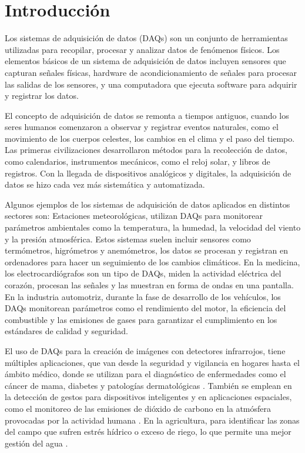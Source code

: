 \chapter{Introducción}

Los sistemas de adquisición de datos (DAQs) son un conjunto de herramientas utilizadas para recopilar, procesar y analizar datos de fenómenos físicos. Los elementos básicos de un sistema de adquisición de datos incluyen sensores que capturan señales físicas, hardware de acondicionamiento de señales para procesar las salidas de los sensores, y una computadora que ejecuta software para adquirir y registrar los datos. 


El concepto de adquisición de datos se remonta a tiempos antiguos, cuando los seres humanos comenzaron a observar y registrar eventos naturales, como el movimiento de los cuerpos celestes, los cambios en el clima y el paso del tiempo. Las primeras civilizaciones desarrollaron métodos para la recolección de datos, como calendarios, instrumentos mecánicos, como el reloj solar, y libros de registros. Con la llegada de dispositivos analógicos y digitales, la adquisición de datos se hizo cada vez más sistemática y automatizada.


Algunos ejemplos de los sistemas de adquisición de datos aplicados en distintos sectores son: Estaciones meteorológicas, utilizan DAQs para monitorear parámetros ambientales como la temperatura, la humedad, la velocidad del viento y la presión atmosférica. Estos sistemas suelen incluir sensores como termómetros, higrómetros y anemómetros, los datos se procesan y registran en ordenadores para hacer un seguimiento de los cambios climáticos. En la medicina, los electrocardiógrafos son un tipo de DAQs, miden la actividad eléctrica del corazón, procesan las señales y las muestran en forma de ondas en una pantalla. En la industria automotriz, durante la fase de desarrollo de los vehículos, los DAQs monitorean parámetros como el rendimiento del motor, la eficiencia del combustible y las emisiones de gases para garantizar el cumplimiento en los estándares de calidad y seguridad.


El uso de DAQs para la creación de imágenes con detectores infrarrojos, tiene múltiples aplicaciones, que van desde la seguridad y vigilancia en hogares \cite{Yii2023} hasta el ámbito médico, donde se utilizan para el diagnóstico de enfermedades como el cáncer de mama, diabetes \cite{LeneroBardallo2022} y patologías dermatológicas \cite{She2024}. También se emplean en la detección de gestos para dispositivos inteligentes \cite{LeBa2019} y en aplicaciones espaciales, como el monitoreo de las emisiones de dióxido de carbono en la atmósfera provocadas por la actividad humana \cite{Minoglou2019}. En la agricultura, para identificar las zonas del campo que sufren estrés hídrico o exceso de riego, lo que permite una mejor gestión del agua \cite{Parihar2021}.


